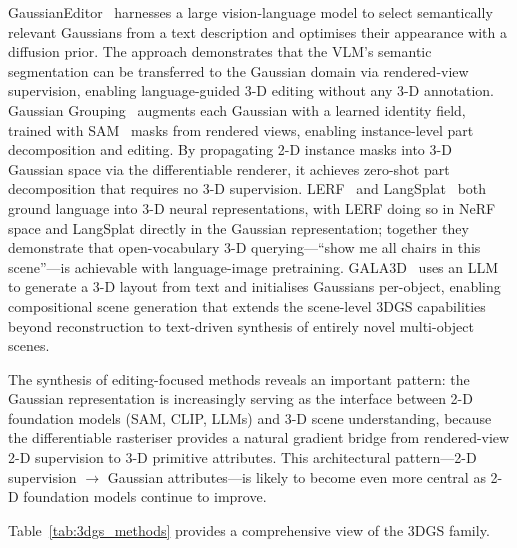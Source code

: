 GaussianEditor~\citep{chen2024gaussianeditor} harnesses a large vision-language
model to select semantically relevant Gaussians from a text description and
optimises their appearance with a diffusion prior.
The approach demonstrates that the VLM's semantic segmentation can be
transferred to the Gaussian domain via rendered-view supervision, enabling
language-guided 3-D editing without any 3-D annotation.
Gaussian Grouping~\citep{ye2023gaussian_grouping} augments each Gaussian with
a learned identity field, trained with SAM~\citep{kirillov2023sam} masks from
rendered views, enabling instance-level part decomposition and editing.
By propagating 2-D instance masks into 3-D Gaussian space via the differentiable
renderer, it achieves zero-shot part decomposition that requires no 3-D
supervision.
LERF~\citep{kerr2023lerf} and LangSplat~\citep{qin2024langsplat} both
ground language into 3-D neural representations, with LERF doing so in
NeRF space and LangSplat directly in the Gaussian representation;
together they demonstrate that open-vocabulary 3-D querying---``show me all
chairs in this scene''---is achievable with language-image pretraining.
GALA3D~\citep{zhou2024gala3d} uses an LLM to generate a 3-D layout from text
and initialises Gaussians per-object, enabling compositional scene generation
that extends the scene-level 3DGS capabilities beyond reconstruction to text-driven
synthesis of entirely novel multi-object scenes.

The synthesis of editing-focused methods reveals an important pattern:
the Gaussian representation is increasingly serving as the interface between
2-D foundation models (SAM, CLIP, LLMs) and 3-D scene understanding,
because the differentiable rasteriser provides a natural gradient bridge
from rendered-view 2-D supervision to 3-D primitive attributes.
This architectural pattern---2-D supervision $\to$ Gaussian attributes---is
likely to become even more central as 2-D foundation models continue to improve.

Table~\ref{tab:3dgs_methods} provides a comprehensive view of the 3DGS family.

